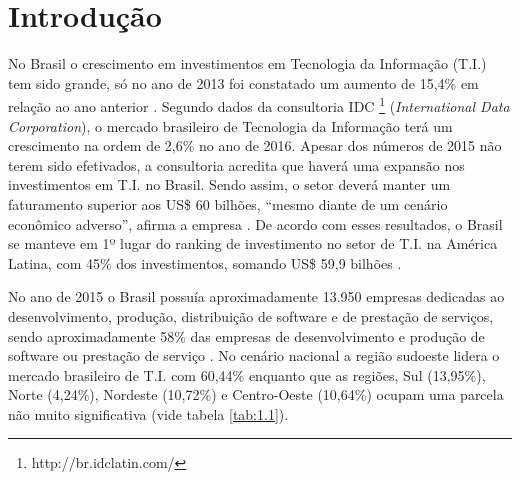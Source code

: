 \chapter{Introdução}
\label{cap:intro}




No Brasil o crescimento em investimentos em Tecnologia da Informação (T.I.) tem sido grande, só no ano de 2013 foi constatado um aumento de 15,4\% em relação ao ano anterior \cite{SilvaDias2015}. Segundo dados da consultoria IDC \footnote{http://br.idclatin.com/} (\textit{International Data Corporation}), o mercado brasileiro de Tecnologia da Informação terá um crescimento na ordem de 2,6\% no ano de 2016. Apesar dos números de 2015 não terem sido efetivados, a consultoria acredita que haverá uma expansão nos investimentos em T.I. no Brasil. Sendo assim, o setor deverá manter um faturamento superior aos US\$ 60 bilhões, “mesmo diante de um cenário econômico adverso”, afirma a empresa \cite{FelipeDreher2016}. De acordo com esses resultados, o Brasil se manteve em 1º lugar do ranking de investimento no setor de T.I. na América Latina, com 45\% dos investimentos, somando US\$ 59,9 bilhões \cite{FelipeDreher2016}.

No ano de 2015 o Brasil possuía aproximadamente 13.950 empresas dedicadas ao desenvolvimento, produção, distribuição de software e de prestação de serviços, sendo aproximadamente 58\% das empresas de desenvolvimento e produção de software ou prestação de serviço \cite{abranet2016}. No cenário nacional a região sudoeste lidera o mercado brasileiro de T.I. com 60,44\% enquanto que as regiões, Sul (13,95\%), Norte (4,24\%), Nordeste (10,72\%) e Centro-Oeste (10,64\%) ocupam uma parcela não muito significativa (vide tabela \ref{tab:1.1}).

